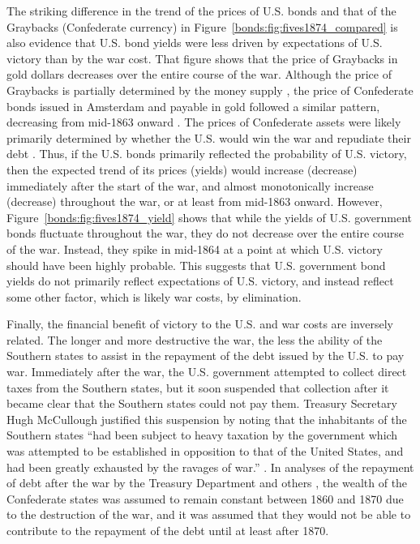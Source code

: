 The striking difference in the trend of the prices of U.S. bonds and that of the Graybacks (Confederate currency) in Figure~\ref{bonds:fig:fives1874_compared} is also evidence that U.S. bond yields were less driven by expectations of U.S. victory than by the war cost.
That figure shows that the price of Graybacks in gold dollars decreases over the entire course of the war.
Although the price of Graybacks is partially determined by the money supply \parencite{BurdekinWeidenmier2001}, the price of Confederate bonds issued in Amsterdam and payable in gold followed a similar pattern, decreasing from  mid-1863 onward \parencite{HaberMitchenerOosterlinckEtAl2015}.
The prices of Confederate assets were likely primarily determined by whether the U.S. would win the war and repudiate their debt \parencite{HaberMitchenerOosterlinckEtAl2015}.
Thus, if the U.S. bonds primarily reflected the probability of U.S. victory, then the expected trend of its prices (yields) would increase (decrease) immediately after the start of the war, and almost monotonically increase (decrease) throughout the war, or at least from mid-1863 onward.
However, Figure~\ref{bonds:fig:fives1874_yield} shows that while the yields of U.S. government bonds fluctuate throughout the war, they do not decrease over the entire course of the war.
Instead, they spike in mid-1864 at a point at which U.S. victory should have been highly probable.
This suggests that U.S. government bond yields do not primarily reflect expectations of U.S. victory, and instead reflect some other factor, which is likely war costs, by elimination.

Finally, the financial benefit of victory to the U.S. and war costs are inversely related.
The longer and more destructive the war, the less the ability of the Southern states to assist in the repayment of the debt issued by the U.S. to pay war.
Immediately after the war, the U.S. government attempted to collect direct taxes from the Southern states, but it soon suspended that collection after it became clear that the Southern states could not pay them.
Treasury Secretary Hugh McCullough justified this suspension by noting that the inhabitants of the Southern states ``had been subject to heavy taxation by the government which was attempted to be established in opposition to that of the United States, and had been greatly exhausted by the ravages of war.'' \parencite[29]{Treasury1865}.
In analyses of the repayment of debt after the war by the Treasury Department and others \parencites{Elder1865}{Treasury1865}{Walker1865a}, the wealth of the Confederate states was assumed to remain constant between 1860 and 1870 due to the destruction of the war, and it was assumed that they would not be able to contribute to the repayment of the debt until at least after 1870.

